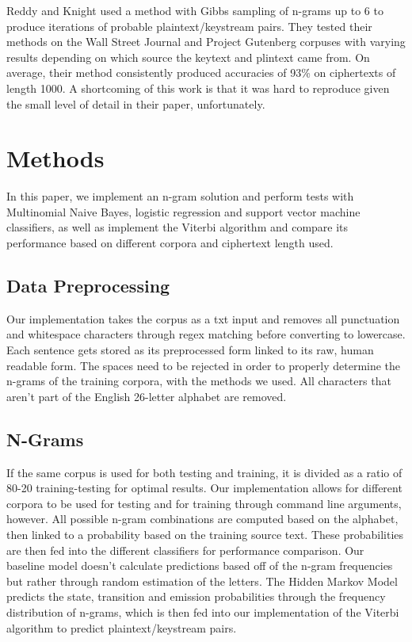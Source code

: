 \documentclass[11pt,letterpaper]{article}
\begin{document}
Reddy and Knight \cite{Reddy:12} used a method with Gibbs sampling of n-grams up to 6 to produce iterations of probable plaintext/keystream pairs. They tested their methods on the Wall Street Journal and Project Gutenberg corpuses with varying results depending on which source the keytext and plintext came from. On average, their method consistently produced accuracies of 93\% on ciphertexts of length 1000. A shortcoming of this work is that it was hard to reproduce given the small level of detail in their paper, unfortunately. 

\section{Methods}
In this paper, we implement an n-gram solution and perform tests with Multinomial Naive Bayes, logistic regression and support vector machine classifiers, as well as implement the Viterbi algorithm and compare its performance based on different corpora and ciphertext length used. 

\subsection{Data Preprocessing}
Our implementation takes the corpus as a txt input and removes all punctuation and whitespace characters through regex matching before converting to lowercase. Each sentence gets stored as its preprocessed form linked to its raw, human readable form. The spaces need to be rejected in order to properly determine the n-grams of the training corpora, with the methods we used. All characters that aren't part of the English 26-letter alphabet are removed.

\subsection{N-Grams}
If the same corpus is used for both testing and training, it is divided as a ratio of 80-20 training-testing for optimal results. Our implementation allows for different corpora to be used for testing and for training through command line arguments, however. All possible n-gram combinations are computed based on the alphabet, then linked to a probability based on the training source text. These probabilities are then fed into the different classifiers for performance comparison. Our baseline model doesn't calculate predictions based off of the n-gram frequencies but rather through random estimation of the letters. The Hidden Markov Model predicts the state, transition and emission probabilities through the frequency distribution of n-grams, which is then fed into our implementation of the Viterbi algorithm to predict plaintext/keystream pairs.
\end{document}
